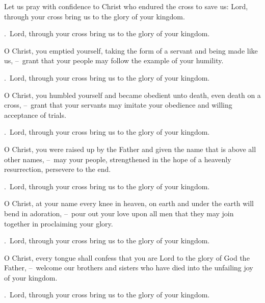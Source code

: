 \lettrine[loversize=0.15,lines=2]{L}{}et us pray with confidence to Christ who endured the cross to save us: Lord, through your cross bring us to the glory of your kingdom.
\par \Rbar.~Lord, through your cross bring us to the glory of your kingdom.

O Christ, you emptied yourself, taking the form of a servant and being made like us,
– grant that your people may follow the example of your humility.
\par \Rbar.~Lord, through your cross bring us to the glory of your kingdom.

O Christ, you humbled yourself and became obedient unto death, even death on a cross,
– grant that your servants may imitate your obedience and willing acceptance of trials.
\par \Rbar.~Lord, through your cross bring us to the glory of your kingdom.

O Christ, you were raised up by the Father and given the name that is above all other names,
– may your people, strengthened in the hope of a heavenly resurrection, persevere to the end.
\par \Rbar.~Lord, through your cross bring us to the glory of your kingdom.

O Christ, at your name every knee in heaven, on earth and under the earth will bend in adoration,
– pour out your love upon all men that they may join together in proclaiming your glory.
\par \Rbar.~Lord, through your cross bring us to the glory of your kingdom.

O Christ, every tongue shall confess that you are Lord to the glory of God the Father,
– welcome our brothers and sisters who have died into the unfailing joy of your kingdom.
\par \Rbar.~Lord, through your cross bring us to the glory of your kingdom.
